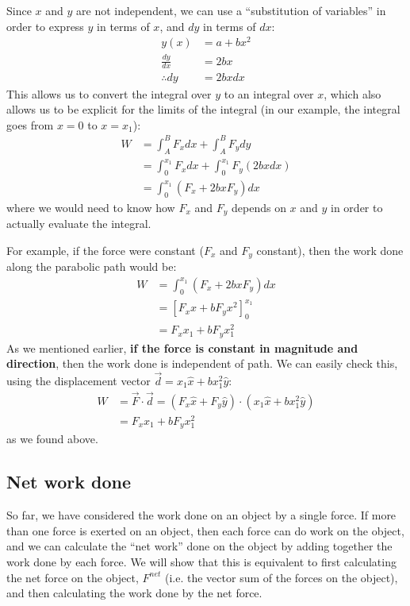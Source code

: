 \begin{example}
Since $x$ and $y$ are not independent, we can use a ``substitution of variables'' in order to express $y$ in terms of $x$, and $dy$ in terms of $dx$:
\begin{align*}
y(x) &= a + bx^2\\
\frac{dy}{dx} &= 2bx\\
\therefore dy &= 2bxdx
\end{align*} 
This allows us to convert the integral over $y$ to an integral over $x$, which also allows us to be explicit for the limits of the integral (in our example, the integral goes from $x=0$ to $x=x_1$):
\begin{align*}
W&= \int_A^B F_x dx + \int_A^B F_ydy\\
&=\int_0^{x_1} F_x dx + \int_0^{x_1} F_y(2bxdx)\\
&=\int_0^{x_1} (F_x + 2bxF_y)dx
\end{align*}
where we would need to know how $F_x$ and $F_y$ depends on $x$ and $y$ in order to actually evaluate the integral.

For example, if the force were constant ($F_x$ and $F_y$ constant), then the work done along the parabolic path would be:
\begin{align*}
W &= \int_0^{x_1} (F_x + 2bxF_y)dx\\
&=\left[F_x x + bF_yx^2  \right]_0^{x_1}\\
&=F_x x_1 + bF_yx_1^2
\end{align*}
As we mentioned earlier, \textbf{if the force is constant in magnitude and direction}, then the work done is independent of path. We can easily check this, using the displacement vector $\vec d = x_1\hat x + bx_1^2 \hat y$:
\begin{align*}
W &= \vec F \cdot \vec d = (F_x\hat x+ F_y\hat y) \cdot (x_1\hat x + bx_1^2 \hat y)\\
&=F_x x_1 + bF_yx_1^2
\end{align*}
as we found above. 
\end{example}

\subsection{Net work done}
So far, we have considered the work done on an object by a single force. If more than one force is exerted on an object, then each force can do work on the object, and we can calculate the ``net work'' done on the object by adding together the work done by each force. We will show that this is equivalent to first calculating the net force on the object, $F^{net}$ (i.e. the vector sum of the forces on the object), and then calculating the work done by the net force.
 
